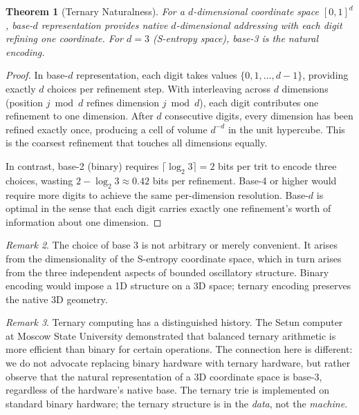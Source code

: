 \documentclass[11pt,a4paper]{article}
\newtheorem{theorem}{Theorem}[section]
\theoremstyle{definition}
\theoremstyle{remark}
\newtheorem{remark}[theorem]{Remark}
\begin{document}
\begin{theorem}[Ternary Naturalness]
\label{thm:ternary_natural}
For a $d$-dimensional coordinate space $[0,1]^d$, base-$d$ representation provides native $d$-dimensional addressing with each digit refining one coordinate. For $d = 3$ (S-entropy space), base-3 is the natural encoding.
\end{theorem}

\begin{proof}
In base-$d$ representation, each digit takes values $\{0, 1, \ldots, d-1\}$, providing exactly $d$ choices per refinement step. With interleaving across $d$ dimensions (position $j \bmod d$ refines dimension $j \bmod d$), each digit contributes one refinement to one dimension. After $d$ consecutive digits, every dimension has been refined exactly once, producing a cell of volume $d^{-d}$ in the unit hypercube. This is the coarsest refinement that touches all dimensions equally.

In contrast, base-2 (binary) requires $\lceil \log_2 3 \rceil = 2$ bits per trit to encode three choices, wasting $2 - \log_2 3 \approx 0.42$ bits per refinement. Base-4 or higher would require more digits to achieve the same per-dimension resolution. Base-$d$ is optimal in the sense that each digit carries exactly one refinement's worth of information about one dimension.
\end{proof}

\begin{remark}
The choice of base 3 is not arbitrary or merely convenient. It arises from the dimensionality of the S-entropy coordinate space, which in turn arises from the three independent aspects of bounded oscillatory structure. Binary encoding would impose a 1D structure on a 3D space; ternary encoding preserves the native 3D geometry.
\end{remark}

\begin{remark}
Ternary computing has a distinguished history. The Setun computer at Moscow State University \citep{brusentsov1962} demonstrated that balanced ternary arithmetic is more efficient than binary for certain operations. The connection here is different: we do not advocate replacing binary hardware with ternary hardware, but rather observe that the natural representation of a 3D coordinate space is base-3, regardless of the hardware's native base. The ternary trie is implemented on standard binary hardware; the ternary structure is in the \emph{data}, not the \emph{machine}.
\end{remark}
\end{document}
